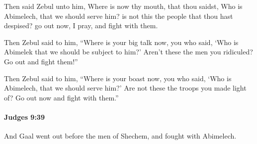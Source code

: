 			\begin{versebox}
					\item[BHS] 
					\item[ASV] Then said Zebul unto him, Where is now thy mouth, that thou saidst, Who is Abimelech, that we should serve him? is not this the people that thou hast despised? go out now, I pray, and fight with them.
					\item[NIV] Then Zebul said to him, “Where is your big talk now, you who said, ‘Who is Abimelek that we should be subject to him?’ Aren’t these the men you ridiculed? Go out and fight them!”
					\item[NRSV] Then Zebul said to him, “Where is your boast now, you who said, ‘Who is Abimelech, that we should serve him?’ Are not these the troops you made light of? Go out now and fight with them.”
			\end{versebox}

		\paragraph{Judges 9:39} %
			\label{JUDGES-9-39}

			And Gaal went out before the men of Shechem, and fought with Abimelech.

